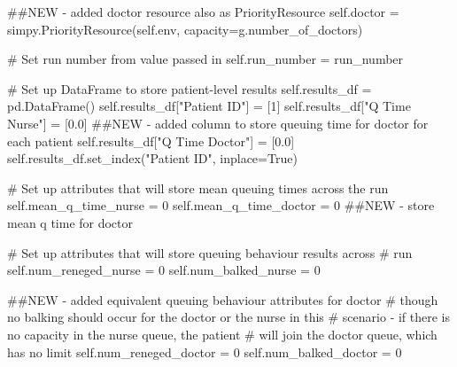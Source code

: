 \documentclass[
  letterpaper,
  DIV=11,
  numbers=noendperiod]{scrreprt}
\newenvironment{Shaded}{\begin{snugshade}}{\end{snugshade}}
\newcommand{\CommentTok}[1]{\textcolor[rgb]{0.37,0.37,0.37}{#1}}
\newcommand{\DecValTok}[1]{\textcolor[rgb]{0.68,0.00,0.00}{#1}}
\newcommand{\FloatTok}[1]{\textcolor[rgb]{0.68,0.00,0.00}{#1}}
\newcommand{\NormalTok}[1]{\textcolor[rgb]{0.00,0.23,0.31}{#1}}
\newcommand{\OperatorTok}[1]{\textcolor[rgb]{0.37,0.37,0.37}{#1}}
\newcommand{\StringTok}[1]{\textcolor[rgb]{0.13,0.47,0.30}{#1}}
\newcommand{\VariableTok}[1]{\textcolor[rgb]{0.07,0.07,0.07}{#1}}
\begin{document}
\begin{tcolorbox}
\begin{Shaded}
\begin{Highlighting}[]
        \CommentTok{\#\#NEW {-} added doctor resource also as PriorityResource}
        \VariableTok{self}\NormalTok{.doctor }\OperatorTok{=}\NormalTok{ simpy.PriorityResource(}\VariableTok{self}\NormalTok{.env,}
\NormalTok{                                             capacity}\OperatorTok{=}\NormalTok{g.number\_of\_doctors)}

        \CommentTok{\# Set run number from value passed in}
        \VariableTok{self}\NormalTok{.run\_number }\OperatorTok{=}\NormalTok{ run\_number}

        \CommentTok{\# Set up DataFrame to store patient{-}level results}
        \VariableTok{self}\NormalTok{.results\_df }\OperatorTok{=}\NormalTok{ pd.DataFrame()}
        \VariableTok{self}\NormalTok{.results\_df[}\StringTok{"Patient ID"}\NormalTok{] }\OperatorTok{=}\NormalTok{ [}\DecValTok{1}\NormalTok{]}
        \VariableTok{self}\NormalTok{.results\_df[}\StringTok{"Q Time Nurse"}\NormalTok{] }\OperatorTok{=}\NormalTok{ [}\FloatTok{0.0}\NormalTok{]}
        \CommentTok{\#\#NEW {-} added column to store queuing time for doctor for each patient}
        \VariableTok{self}\NormalTok{.results\_df[}\StringTok{"Q Time Doctor"}\NormalTok{] }\OperatorTok{=}\NormalTok{ [}\FloatTok{0.0}\NormalTok{]}
        \VariableTok{self}\NormalTok{.results\_df.set\_index(}\StringTok{"Patient ID"}\NormalTok{, inplace}\OperatorTok{=}\VariableTok{True}\NormalTok{)}

        \CommentTok{\# Set up attributes that will store mean queuing times across the run}
        \VariableTok{self}\NormalTok{.mean\_q\_time\_nurse }\OperatorTok{=} \DecValTok{0}
        \VariableTok{self}\NormalTok{.mean\_q\_time\_doctor }\OperatorTok{=} \DecValTok{0} \CommentTok{\#\#NEW {-} store mean q time for doctor}

        \CommentTok{\# Set up attributes that will store queuing behaviour results across}
        \CommentTok{\# run}
        \VariableTok{self}\NormalTok{.num\_reneged\_nurse }\OperatorTok{=} \DecValTok{0}
        \VariableTok{self}\NormalTok{.num\_balked\_nurse }\OperatorTok{=} \DecValTok{0}

        \CommentTok{\#\#NEW {-} added equivalent queuing behaviour attributes for doctor}
        \CommentTok{\# though no balking should occur for the doctor or the nurse in this}
        \CommentTok{\# scenario {-} if there is no capacity in the nurse queue, the patient}
        \CommentTok{\# will join the doctor queue, which has no limit}
        \VariableTok{self}\NormalTok{.num\_reneged\_doctor }\OperatorTok{=} \DecValTok{0}
        \VariableTok{self}\NormalTok{.num\_balked\_doctor }\OperatorTok{=} \DecValTok{0}


\end{Highlighting}
\end{Shaded}
\end{tcolorbox}
\end{document}
